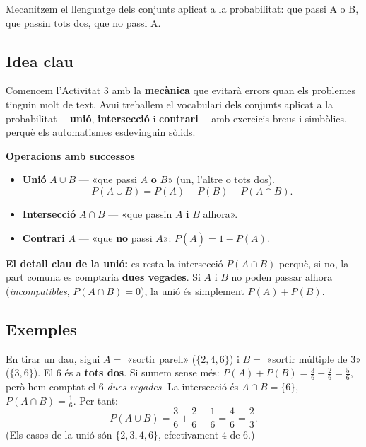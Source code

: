 %
{Mecanitzem el llenguatge dels conjunts aplicat a la probabilitat: que passi A o B, que passin tots dos, que no passi A.}

\subsection{Idea clau}

Comencem l'Activitat 3 amb la \textbf{mecànica} que evitarà errors quan els problemes
tinguin molt de text. Avui treballem el vocabulari dels conjunts aplicat a la
probabilitat —\textbf{unió}, \textbf{intersecció} i \textbf{contrari}— amb exercicis
breus i simbòlics, perquè els automatismes esdevinguin sòlids.

\begin{idea}
\textbf{Operacions amb successos}
\begin{itemize}[leftmargin=1.4em, itemsep=3pt]
  \item \textbf{Unió} $A\cup B$ — «que passi $A$ \textbf{o} $B$» (un, l'altre o tots dos).
        \[
        P(A\cup B)=P(A)+P(B)-P(A\cap B).
        \]
  \item \textbf{Intersecció} $A\cap B$ — «que passin $A$ \textbf{i} $B$ alhora».
  \item \textbf{Contrari} $\overline{A}$ — «que \textbf{no} passi $A$»: \quad
        $P(\overline{A})=1-P(A)$.
\end{itemize}
\textbf{El detall clau de la unió:} es resta la intersecció $P(A\cap B)$ perquè, si no,
la part comuna es comptaria \textbf{dues vegades}. Si $A$ i $B$ no poden passar alhora
(\emph{incompatibles}, $P(A\cap B)=0$), la unió és simplement $P(A)+P(B)$.
\end{idea}

\subsection{Exemples}

\begin{exemple}
En tirar un dau, sigui $A=$ «sortir parell» ($\{2,4,6\}$) i $B=$ «sortir múltiple de
$3$» ($\{3,6\}$). El $6$ és a \textbf{tots dos}. Si sumem sense més:
$P(A)+P(B)=\frac{3}{6}+\frac{2}{6}=\frac{5}{6}$, però hem comptat el $6$ \emph{dues
vegades}. La intersecció és $A\cap B=\{6\}$, $P(A\cap B)=\frac{1}{6}$. Per tant:
\[
P(A\cup B)=\frac{3}{6}+\frac{2}{6}-\frac{1}{6}=\frac{4}{6}=\frac{2}{3}.
\]
(Els casos de la unió són $\{2,3,4,6\}$, efectivament $4$ de $6$.)
\end{exemple}

